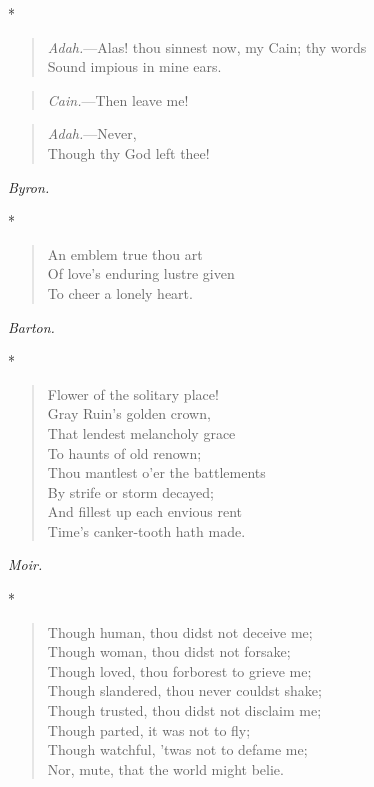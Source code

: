 \documentclass[11pt,twoside]{article}
\newcommand\stars{\begin{center}*\quad*\quad*\end{center}}
\newcommand\by[1]{\par\hfill\textit{#1}\par}
\begin{document}
\stars

\begin{verse}
\quad \emph{Adah.}---Alas! thou sinnest now, my Cain; thy words\\
Sound impious in mine ears.
\end{verse}

\begin{verse}
\emph{Cain.}---Then leave me!
\end{verse}

\begin{verse}
\quad \emph{Adah.}---Never,\\
Though thy God left thee!
\end{verse}

\by{Byron.}

\stars

\begin{verse}
An emblem true thou art\\
\quad Of love’s enduring lustre given\\
To cheer a lonely heart.
\end{verse}

\by{Barton.}

\stars

\begin{verse}
Flower of the solitary place!\\
\quad Gray Ruin’s golden crown,\\
That lendest melancholy grace\\
\quad To haunts of old renown;\\
Thou mantlest o’er the battlements\\
\quad By strife or storm decayed;\\
And fillest up each envious rent\\
\quad Time’s canker-tooth hath made.
\end{verse}

\by{Moir.}

\stars

\begin{verse}
Though human, thou didst not deceive me;\\
\quad Though woman, thou didst not forsake;\\
Though loved, thou forborest to grieve me;\\
\quad Though slandered, thou never couldst shake;\\
Though trusted, thou didst not disclaim me;\\
\quad Though parted, it was not to fly;\\
Though watchful, ’twas not to defame me;\\
\quad Nor, mute, that the world might belie.
\end{verse}
\end{document}
